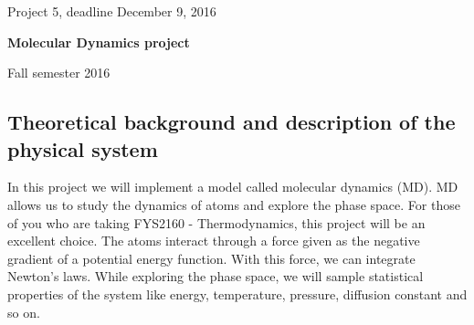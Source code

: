 \documentclass[%
oneside,                 %
final,                   %
10pt]{article}
\begin{document}

\newcommand{\exercisesection}[1]{\subsection*{#1}}






\thispagestyle{empty}

\begin{center}
{\LARGE\bf
\begin{spacing}{1.25}
Project 5, deadline  December 9, 2016
\end{spacing}
}
\end{center}


\begin{center}
{\bf Molecular Dynamics project${}^{}$} \\ [0mm]
\end{center}

\begin{center}
\end{center}
    

\begin{center}
Fall semester 2016
\end{center}

\vspace{1cm}


\subsection{Theoretical background and description of the physical system}
In this project we will implement a model called molecular dynamics (MD). MD allows us to study the dynamics of atoms and explore the phase space. For those of you who are taking FYS2160 - Thermodynamics, this project will be an excellent choice. The atoms interact through a force given as the negative gradient of a potential energy function. With this force, we can integrate Newton's laws. While exploring the phase space, we will sample statistical properties of the system like energy, temperature, pressure, diffusion constant and so on.
\end{document}
